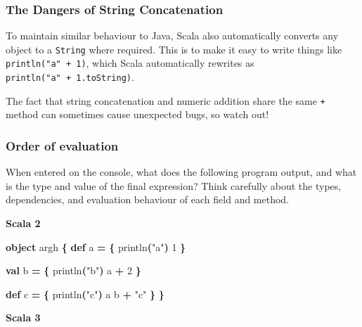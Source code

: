 \documentclass[11pt,a5paper,]{book}
\newenvironment{Shaded}{\begin{snugshade}}{\end{snugshade}}
\newcommand{\DecValTok}[1]{\textcolor[rgb]{0.00,0.00,0.81}{#1}}
\newcommand{\FunctionTok}[1]{\textcolor[rgb]{0.00,0.00,0.00}{#1}}
\newcommand{\KeywordTok}[1]{\textcolor[rgb]{0.13,0.29,0.53}{\textbf{#1}}}
\newcommand{\NormalTok}[1]{#1}
\newcommand{\OperatorTok}[1]{\textcolor[rgb]{0.81,0.36,0.00}{\textbf{#1}}}
\newcommand{\StringTok}[1]{\textcolor[rgb]{0.31,0.60,0.02}{#1}}
\begin{document}
\hypertarget{the-dangers-of-string-concatenation}{%
\subsubsection*{The Dangers of String
Concatenation}\label{the-dangers-of-string-concatenation}}

To maintain similar behaviour to Java, Scala also automatically converts
any object to a \texttt{String} where required. This is to make it easy
to write things like \texttt{println("a"\ +\ 1)}, which Scala
automatically rewrites as \texttt{println("a"\ +\ 1.toString)}.

The fact that string concatenation and numeric addition share the same
\texttt{+} method can sometimes cause unexpected bugs, so watch out!

\hypertarget{order-of-evaluation}{%
\subsubsection{Order of evaluation}\label{order-of-evaluation}}

When entered on the console, what does the following program output, and
what is the type and value of the final expression? Think carefully
about the types, dependencies, and evaluation behaviour of each field
and method.

\textbf{Scala 2}

\begin{Shaded}
\begin{Highlighting}[]
\KeywordTok{object}\NormalTok{ argh }\OperatorTok{\{}
  \KeywordTok{def}\NormalTok{ a }\OperatorTok{=} \OperatorTok{\{}
    \FunctionTok{println}\OperatorTok{(}\StringTok{"a"}\OperatorTok{)}
    \DecValTok{1}
  \OperatorTok{\}}

  \KeywordTok{val}\NormalTok{ b }\OperatorTok{=} \OperatorTok{\{}
    \FunctionTok{println}\OperatorTok{(}\StringTok{"b"}\OperatorTok{)}
\NormalTok{    a }\OperatorTok{+} \DecValTok{2}
  \OperatorTok{\}}

  \KeywordTok{def}\NormalTok{ c }\OperatorTok{=} \OperatorTok{\{}
    \FunctionTok{println}\OperatorTok{(}\StringTok{"c"}\OperatorTok{)}
\NormalTok{    a}
\NormalTok{    b }\OperatorTok{+} \StringTok{"c"}
  \OperatorTok{\}}
\OperatorTok{\}}
\end{Highlighting}
\end{Shaded}

\textbf{Scala 3}
\end{document}
